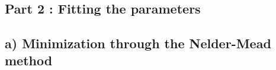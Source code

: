 \documentclass[11pt]{article}
\begin{document}
    \begin{center}
    \end{center}
    { \hspace*{\fill} \\}
    
    \subsection{Part 2 : Fitting the
parameters}\label{part-2-fitting-the-parameters}

    \subsection{a) Minimization through the Nelder-Mead
method}\label{a-minimization-through-the-nelder-mead-method}
\end{document}
